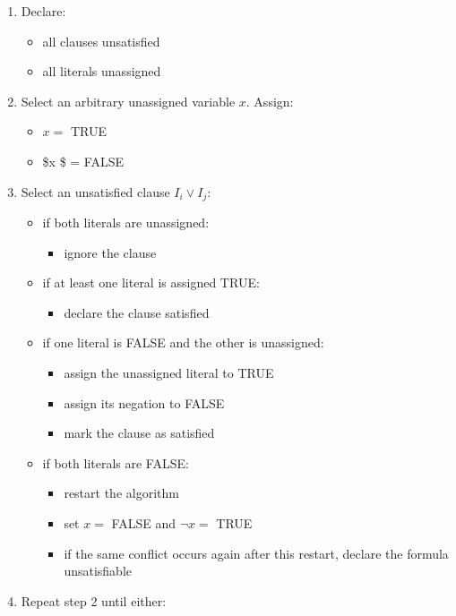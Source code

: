 \documentclass[11pt]{article}
\providecommand{\tightlist}{%
      \setlength{\itemsep}{0pt}\setlength{\parskip}{0pt}}
\begin{document}
\begin{enumerate}
\def\labelenumi{\arabic{enumi}.}
\setcounter{enumi}{-1}
\tightlist
\item
  Declare:

  \begin{itemize}
  \tightlist
  \item
    all clauses unsatisfied
  \item
    all literals unassigned
  \end{itemize}
\item
  Select an arbitrary unassigned variable \(x\). Assign:

  \begin{itemize}
  \tightlist
  \item
    \(x =\) TRUE
  \item
    \$\neg x \$ = FALSE
  \end{itemize}
\item
  Select an unsatisfied clause \(I_i \lor I_j\):

  \begin{itemize}
  \tightlist
  \item
    if both literals are unassigned:

    \begin{itemize}
    \tightlist
    \item
      ignore the clause
    \end{itemize}
  \item
    if at least one literal is assigned TRUE:

    \begin{itemize}
    \tightlist
    \item
      declare the clause satisfied
    \end{itemize}
  \item
    if one literal is FALSE and the other is unassigned:

    \begin{itemize}
    \tightlist
    \item
      assign the unassigned literal to TRUE
    \item
      assign its negation to FALSE
    \item
      mark the clause as satisfied
    \end{itemize}
  \item
    if both literals are FALSE:

    \begin{itemize}
    \tightlist
    \item
      restart the algorithm
    \item
      set \(x =\) FALSE and \(\neg x =\) TRUE
    \item
      if the same conflict occurs again after this restart, declare the
      formula unsatisfiable
    \end{itemize}
  \end{itemize}
\item
  Repeat step 2 until either:


\end{enumerate}
\end{document}
